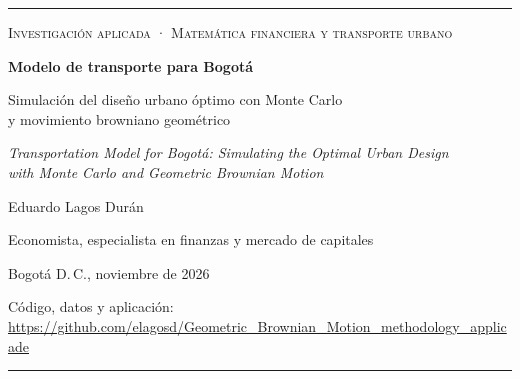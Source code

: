\begin{titlepage}
\centering
\vspace*{1.2cm}
{\color{azulinv}\rule{\textwidth}{1.2pt}}\par\vspace{0.8cm}
{\small\scshape Investigación aplicada · Matemática financiera y transporte urbano\par}
\vspace{1.4cm}
{\LARGE\bfseries Modelo de transporte para Bogotá\par}
\vspace{0.5cm}
{\Large Simulación del diseño urbano óptimo con Monte Carlo\\ y movimiento browniano geométrico\par}
\vspace{0.6cm}
{\large\itshape Transportation Model for Bogotá: Simulating the Optimal Urban Design\\ with Monte Carlo and Geometric Brownian Motion\par}
\vspace{2.2cm}
{\large Eduardo Lagos Durán\par}
\vspace{0.3cm}
{\normalsize Economista, especialista en finanzas y mercado de capitales\par}
\vfill
{\small Bogotá D.\,C., noviembre de 2026\par}
\vspace{0.4cm}
{\small Código, datos y aplicación:\\ \url{https://github.com/elagosd/Geometric_Brownian_Motion_methodology_applicade}\par}
{\color{azulinv}\rule{\textwidth}{1.2pt}}
\end{titlepage}
